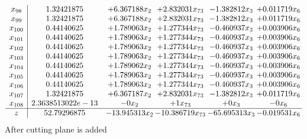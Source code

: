 \documentclass[11pt]{article}
\begin{document}
\[\begin{array}{c| c c@{\hskip 2pt} c@{\hskip 2pt} c@{\hskip 2pt} c@{\hskip 2pt} }
 x_{98}   &  1.32421875 & + 6.367188 x_{2} & + 2.832031 x_{73} & -1.382812 x_{3} & + 0.011719 x_{6}\\
 x_{99}   &  1.32421875 & + 6.367188 x_{2} & + 2.832031 x_{73} & -1.382812 x_{3} & + 0.011719 x_{6}\\
 x_{100}   &  0.44140625 & + 1.789063 x_{2} & + 1.277344 x_{73} & -0.460937 x_{3} & + 0.003906 x_{6}\\
 x_{101}   &  0.44140625 & + 1.789063 x_{2} & + 1.277344 x_{73} & -0.460937 x_{3} & + 0.003906 x_{6}\\
 x_{102}   &  0.44140625 & + 1.789063 x_{2} & + 1.277344 x_{73} & -0.460937 x_{3} & + 0.003906 x_{6}\\
 x_{103}   &  0.44140625 & + 1.789063 x_{2} & + 1.277344 x_{73} & -0.460937 x_{3} & + 0.003906 x_{6}\\
 x_{104}   &  0.44140625 & + 1.789062 x_{2} & + 1.277344 x_{73} & -0.460937 x_{3} & + 0.003906 x_{6}\\
 x_{105}   &  0.44140625 & + 1.789063 x_{2} & + 1.277344 x_{73} & -0.460937 x_{3} & + 0.003906 x_{6}\\
 x_{106}   &  0.44140625 & + 1.789063 x_{2} & + 1.277344 x_{73} & -0.460937 x_{3} & + 0.003906 x_{6}\\
 x_{107}   &  1.32421875 & + 6.367187 x_{2} & + 2.832031 x_{73} & -1.382812 x_{3} & + 0.011719 x_{6}\\
 x_{108}   &  2.3638513022e-13 & -0 x_{2} & + 1 x_{73} & + 0 x_{3} & -0 x_{6}\\
\hline
z    &  52.79296875 & -13.945313 x_{2} & -10.386719 x_{73} & -65.695313 x_{3} & -0.019531 x_{6}\\
\end{array}\]
 After cutting plane is added 
\end{document}
